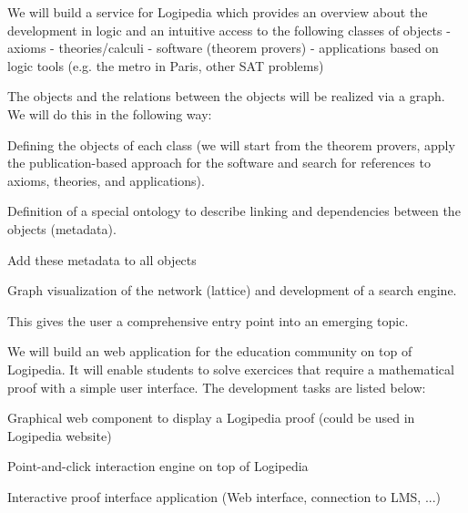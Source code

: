 \begin{workpackage}[id=dissemination,type=MGT,wphases=1-48,
  short={Dissemination},
  title={Dissemination, communication and exploitation},
  lead=Lie,LieRM=1,InrRM=6,BirRM=4,CleRM=2,ImtRM=2,StrRM=2,ZibRM=14,EduRM=12]
\begin{tasklist}
  \begin{task}[id=zib,
      title=Linking scientific publications to Logipedia,
      shorttitle=Pub. link,
      lead=Zib,ZibRM=12,wphases=12-24]
    We will build a service for Logipedia which provides an overview
    about the development in logic and an intuitive access to the
    following classes of objects - axioms - theories/calculi -
    software (theorem provers) - applications based on logic tools
    (e.g. the metro in Paris, other SAT problems)

    The objects and the relations between the objects will be
    realized via a graph. We will do this in the following way:
    \begin{compactitem}
    \item Defining the objects of each class (we will start from the
      theorem provers, apply the publication-based approach for the
      software and search for references to axioms, theories, and
      applications).
    \item Definition of a special ontology to describe linking and
      dependencies between the objects (metadata).
    \item Add these metadata to all objects
    \item Graph visualization of the network (lattice) and development
      of a search engine.
    \end{compactitem}
    This gives the user a comprehensive entry point into an emerging
    topic.
  \end{task}

  \begin{task}[id=edukera,
      title=Web teaching interface for doing proofs at school,
      shorttitle=Teach.,
      lead=Edu,EduRM=12,wphases=19-30]
    We will build an web application for the education community on top of Logipedia. It will enable students to solve exercices that require
    a mathematical proof with a simple user interface.
    The development tasks are listed below:
    \begin{compactitem}
    \item Graphical web component to display a Logipedia proof (could be used in Logipedia website)
    \item Point-and-click interaction engine on top of Logipedia
    \item Interactive proof interface application (Web interface, connection to LMS, ...)
    \end{compactitem}
  \end{task}
  

\end{tasklist}
\end{workpackage}
